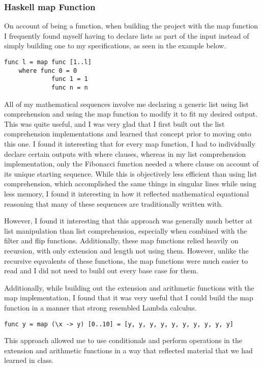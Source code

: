 \documentclass{article}
\theoremstyle{theorem}
\theoremstyle{definition}
\theoremstyle{remark}
\begin{document}
\subsubsection{Haskell map Function}
On account of being a function, when building the project with the map function I frequently found myself having to declare lists as part of the input instead of simply building one to my specifications, as seen in the example below.

\begin{lstlisting}
func l = map func [1..l]
	where func 0 = 0
			 func 1 = 1
			 func n = n
\end{lstlisting}
%
All of my mathematical sequences involve me declaring a generic list using list comprehension and using the map function to modify it to fit my desired output. This was quite useful, and I was very glad that I first built out the list comprehension implementations and learned that concept prior to moving onto this one. I found it interesting that for every map function, I had to individually declare certain outputs with where clauses, whereas in my list comprehension implementation, only the Fibonacci function needed a where clause on account of its unique starting sequence. While this is objectively less efficient than using list comprehension, which accomplished the same things in singular lines while using less memory, I found it interesting in how it reflected mathematical equational reasoning that many of these sequences are traditionally written with.

\medskip\noindent
However, I found it interesting that this approach was generally much better at list manipulation than list comprehension, especially when combined with the filter and flip functions. Additionally, these map functions relied heavily on recursion, with only extension and length not using them. However, unlike the recursive equvalents of these functions, the map functions were much easier to read and I did not need to build out every base case for them.

\medskip\noindent
Additionally, while building out the extension and arithmetic functions with the map implementation, I found that it was very useful that I could build the map function in a manner that strong resembled Lambda calculus.

\begin{lstlisting}
func y = map (\x -> y) [0..10] = [y, y, y, y, y, y, y, y, y, y]
\end{lstlisting}
%
This approach allowed me to use conditionals and perform operations in the extension and arithmetic functions in a way that reflected material that we had learned in class.
\end{document}
